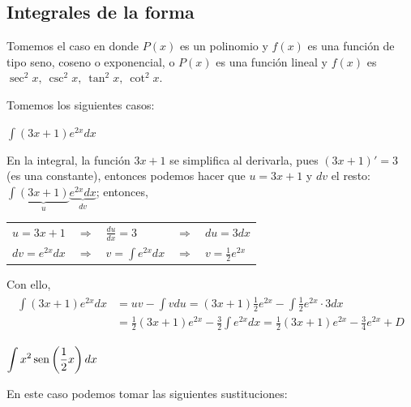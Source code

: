 \subsection{Integrales de la forma \texorpdfstring{}{int P(x)f(x)\,dx}}\label{ProdFunciones}

Tomemos el caso en donde $P\left( x\right) $ es un polinomio y $f(x)$ es una función de tipo seno, coseno o exponencial, o $P(x)$ es una función lineal y $f(x)$ es $\sec ^{2}x,\ \csc^{2}x,\ \tan ^{2}x,\ \cot ^{2}x.$

\begin{ejemplo}
Tomemos los siguientes casos:
\end{ejemplo}

\begin{parrafonumerado}

\item $\displaystyle{\int (3x+1) e^{2x}dx}$

En la integral, la función $3x+1$ se simplifica al derivarla, pues $(3x+1)'=3$ (es una constante), entonces podemos hacer que $u=3x+1$ y $dv$ el resto: $\int \underbrace{(3x+1)}_u \underbrace{e^{2x}dx}_{dv}$; entonces,

\smallskip

\begin{center}
\begin{tabular}{lllll}
  $u=3x+1$ & $\Rightarrow$ & $\frac{du}{dx} =3$ & $\Rightarrow$ & $du=3dx$\\
  $dv=e^{2x}dx$ & $\Rightarrow$ & $v =\int e^{2x}dx$ & $\Rightarrow$ & $v=\frac{1}{2}e^{2x}$
\end{tabular}
\end{center}

\medskip

Con ello,
\begin{gather*}
\begin{aligned}
  \displaystyle{\int (3x+1) e^{2x}dx}&=uv-\int vdu=(3x+1)\frac{1}{2}e^{2x}-\int \frac{1}{2}e^{2x}\cdot 3dx\\
  &=\frac{1}{2}(3x+1)e^{2x}-\frac{3}{2}\int e^{2x}dx=\frac{1}{2}(3x+1)e^{2x}-\frac{3}{4}e^{2x}+D
\end{aligned}
\end{gather*}

\item $\displaystyle{\int x^{2}\operatorname{sen}\left(\frac{1}{2}x\right)dx}$

En este caso podemos tomar las siguientes sustituciones:

\smallskip


\end{parrafonumerado}
